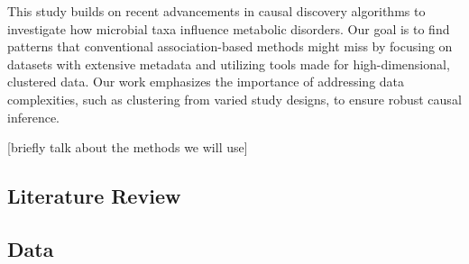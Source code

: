 \documentclass[12pt,letterpaper]{article}
\begin{document}
This study builds on recent advancements in causal discovery algorithms to investigate how microbial taxa influence metabolic disorders. Our goal is to find patterns that conventional association-based methods might miss by focusing on datasets with extensive metadata and utilizing tools made for high-dimensional, clustered data. Our work emphasizes the importance of addressing data complexities, such as clustering from varied study designs, to ensure robust causal inference.

[briefly talk about the methods we will use]


\subsection{Literature Review}

\subsection{Data}
\end{document}
